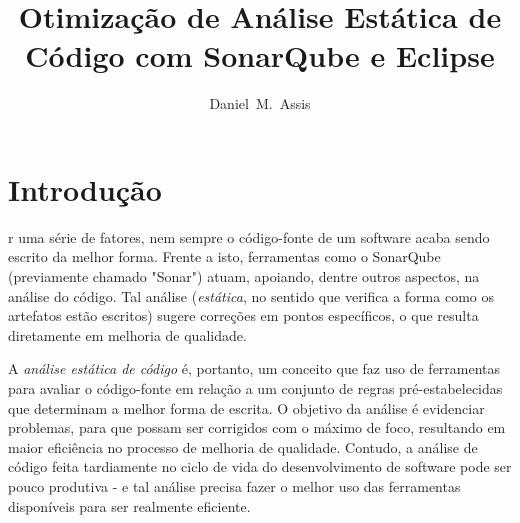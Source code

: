 \documentclass[12pt,journal,compsoc]{IEEEtran}
\begin{document}
\title{Otimização de Análise Estática de Código com SonarQube e Eclipse}
\author{
  Daniel~M.~Assis
}


\maketitle

\IEEEdisplaynotcompsoctitleabstractindextext
\IEEEpeerreviewmaketitle

\section{Introdução}

r uma série de fatores, nem sempre o código-fonte de um software acaba sendo escrito da melhor forma. Frente a isto, ferramentas como o SonarQube\cite{sonarqube} (previamente chamado "Sonar"\cite{sonar_sonarqube})  atuam, apoiando, dentre outros aspectos, na análise do código. Tal análise (\emph{estática}, no sentido que verifica a forma como os artefatos estão escritos) sugere correções em pontos específicos, o que resulta diretamente em melhoria de qualidade. 

A \emph{análise estática de código} é, portanto, um conceito que faz uso de ferramentas para avaliar o código-fonte em relação a um conjunto de regras pré-estabelecidas que determinam a melhor forma de escrita. O objetivo da análise é evidenciar problemas, para que possam ser corrigidos com o máximo de foco, resultando em maior eficiência no processo de melhoria de qualidade. Contudo, a análise de código feita tardiamente no ciclo de vida do desenvolvimento de software pode ser pouco produtiva - e tal análise precisa fazer o melhor uso das ferramentas disponíveis para ser realmente eficiente. 
\end{document}
